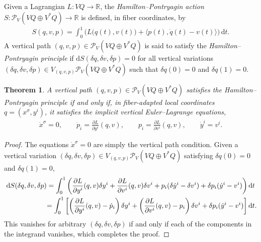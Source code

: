\documentclass[10pt,a4paper]{amsart}
\numberwithin{equation}{section}
\newtheorem{Theorem}{Theorem}[section]
\begin{document}
\begin{Definition}
Given a Lagrangian $ L \colon V Q \rightarrow \mathbb{R} $, the \emph{Hamilton--Pontryagin action} $ S \colon \mathcal{P} _V ( V Q \oplus V ^\ast Q ) \rightarrow \mathbb{R} $ is def\/ined, in f\/iber coordinates, by
 \begin{gather*}
 S (q, v, p) = \int _0 ^1 \bigl( L \bigl( q (t) , v (t) \bigr) + \bigl\langle p (t) , \dot{q} (t) - v (t) \bigr\rangle \bigr) \,\mathrm{d}t .
 \end{gather*}
 A vertical path $ ( q, v , p ) \in \mathcal{P} _V ( V Q \oplus V ^\ast Q ) $ is said to satisfy the \emph{Hamilton--Pontryagin principle} if $ \mathrm{d} S ( \delta q, \delta v , \delta p ) = 0 $ for all vertical variations $ ( \delta q, \delta v , \delta p ) \in V _{ ( q, v, p ) } \mathcal{P} _V ( V Q \oplus V ^\ast Q ) $ such that $ \delta q (0) = 0 $ and $ \delta q (1) = 0 $.
\end{Definition}

\begin{Theorem} A vertical path $ (q,v,p) \in \mathcal{P} _V ( V Q \oplus V ^\ast Q ) $ satisfies the Hamilton--Pontryagin principle if and only if, in fiber-adapted local coordinates $ q = ( x ^\sigma , y ^i ) $, it satisfies the \emph{implicit vertical Euler--Lagrange equations},
 \begin{gather} \label{eq:implicitVEL}
 \dot{x} ^\sigma = 0 , \qquad \dot{p} _i = \frac{ \partial L }{ \partial y ^i } ( q, v ) , \qquad p _i = \frac{ \partial L }{ \partial v ^i } ( q, v ) , \qquad \dot{y} ^i = v ^i .
\end{gather}
\end{Theorem}

\begin{proof} The equations $ \dot{x} ^\sigma = 0 $ are simply the vertical path condition. Given a vertical variation $ (\delta q, \delta v, \delta p ) \in V _{(q,v,p)} \mathcal{P} _V (V Q \oplus V ^\ast Q) $ satisfying $ \delta q (0) = 0 $ and $ \delta q (1) = 0 $,
 \begin{gather*}
 \mathrm{d} S ( \delta q, \delta v , \delta p ) = \int _0 ^1 \left( \frac{ \partial L }{ \partial y ^i } ( q, v ) \delta y ^i + \frac{ \partial L }{ \partial v ^i } ( q, v ) \delta v ^i + p _i ( \delta \dot{y} ^i - \delta v ^i ) + \delta p _i ( \dot{y} ^i - v ^i ) \right) \mathrm{d}t \\
\hphantom{\mathrm{d} S ( \delta q, \delta v , \delta p )}{} = \int _0 ^1 \left[ \left( \frac{ \partial
 L }{ \partial y ^i } ( q, v ) - \dot{p} _i \right) \delta y ^i + \left( \frac{ \partial L }{ \partial v ^i } ( q, v ) - p _i \right) \delta v ^i + \delta p _i ( \dot{y} ^i - v ^i ) \right] \mathrm{d}t .
 \end{gather*}
This vanishes for arbitrary $ ( \delta q, \delta v , \delta p ) $ if and only if each of the components in the integrand vanishes, which completes the proof.
\end{proof}
\end{document}
